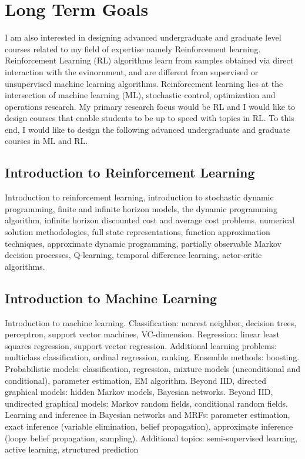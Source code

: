 \documentclass[onecolumn,12pt]{IEEEtran}
\begin{document}
\section{Long Term Goals}
I am also interested in designing advanced undergraduate and graduate level courses related to my field of expertise namely Reinforcement learning.
Reinforcement Learning (RL) algorithms learn from samples obtained via direct interaction with the evinornment, and are different from supervised or unsupervised machine learning algorithms.  Reinforcement learning lies at the intersection of machine learning (ML), stochastic control, optimization and operations research. My primary research focus would be RL and I would like to design courses that enable students to be up to speed with topics in RL. To this end, I would like to design the following advanced undergraduate and graduate courses in ML and RL.
\subsection{Introduction to Reinforcement Learning}
Introduction to reinforcement learning, introduction to stochastic dynamic programming, finite and infinite horizon models, the dynamic programming algorithm, infinite horizon discounted cost and average cost problems, numerical solution methodologies, full state representations, function approximation techniques, approximate dynamic programming, partially observable Markov decision processes, Q-learning, temporal difference learning, actor-critic algorithms.
\subsection{Introduction to Machine Learning}
Introduction to machine learning. Classification: nearest neighbor, decision trees, perceptron, support vector machines, VC-dimension. Regression: linear least squares regression, support vector regression. Additional learning problems: multiclass classification, ordinal regression, ranking. Ensemble methods: boosting. Probabilistic models: classification, regression, mixture models (unconditional and conditional), parameter estimation, EM algorithm. Beyond IID, directed graphical models: hidden Markov models, Bayesian networks. Beyond IID, undirected graphical models: Markov random fields, conditional random fields. Learning and inference in Bayesian networks and MRFs: parameter estimation, exact inference (variable elimination, belief propagation), approximate inference (loopy belief propagation, sampling). Additional topics: semi-supervised learning, active learning, structured prediction
\end{document}
